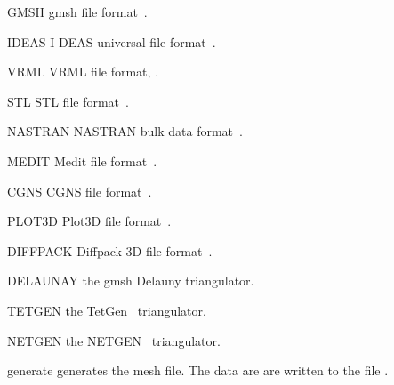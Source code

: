 \begin{memberdesc}[Design]{GMSH}
gmsh file format~\cite{GMSH}. 
\end{memberdesc}

\begin{memberdesc}[Design]{IDEAS}
I-DEAS universal file format~\cite{IDEAS}. 
\end{memberdesc}

\begin{memberdesc}[Design]{VRML}
VRML file format, \cite{VRML}. 
\end{memberdesc}

\begin{memberdesc}[Design]{STL}
STL file format~\cite{STL}. 
\end{memberdesc}
\begin{memberdesc}[Design]{NASTRAN}
NASTRAN  bulk data format~\cite{NASTRAN}.
\end{memberdesc}

\begin{memberdesc}[Design]{MEDIT}
Medit file format~\cite{MEDIT}. 
\end{memberdesc}

\begin{memberdesc}[Design]{CGNS}
CGNS file format~\cite{CGNS}. 
\end{memberdesc}

\begin{memberdesc}[Design]{PLOT3D}
Plot3D file format~\cite{PLOT3D}.  
\end{memberdesc}


\begin{memberdesc}[Design]{DIFFPACK}
Diffpack 3D file format~\cite{DIFFPACK}. 
\end{memberdesc}

\begin{memberdesc}[Design]{DELAUNAY}
the gmsh Delauny triangulator.
\end{memberdesc}

\begin{memberdesc}[Design]{TETGEN}
the TetGen~\cite{TETGEN} triangulator.
\end{memberdesc}

\begin{memberdesc}[Design]{NETGEN}
the NETGEN~\cite{NETGEN} triangulator.
\end{memberdesc}

\begin{methoddesc}[Design]{generate}{}
generates the mesh file. The data are are written to the file .
\end{methoddesc}


